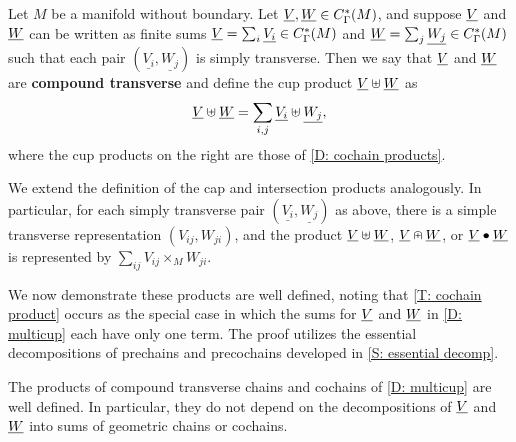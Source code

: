 \begin{definition}\label{D: multicup}
	Let $M$ be a manifold without boundary.
	Let $\underline{V}, \underline{W} \in C_\Gamma^*(M)$, and suppose $\underline{V}$ and $\underline{W}$ can be written as finite sums $\underline{V} = \sum_i \underline{V_i} \in C_\Gamma^*(M)$ and $\underline{W} = \sum_j \underline{W_j} \in C_\Gamma^*(M)$ such that each pair $(\underline{V_i},\underline{W_j})$ is simply transverse.
	Then we say that $\underline{V}$ and $\underline{W}$ are \textbf{compound transverse} and define the cup product $\underline{V}\uplus\underline{W}$ as $$\underline{V}\uplus\underline{W} = \sum_{i,j} \underline{V_i}\uplus \underline{W_j},$$
	where the cup products on the right are those of \cref{D: cochain products}.

	We extend the definition of the cap and intersection products analogously.
	In particular, for each simply transverse pair $(\underline{V_i},\underline{W_j})$ as above, there is a simple transverse representation $(V_{ij}, W_{ji})$, and the product $\underline{V}\uplus \underline{W}$, $\underline{V}\nplus \underline{W}$, or $\underline{V}\bullet\underline{W}$ is represented by $\sum_{ij}V_{ij} \times_M W_{ji}$.
\end{definition}

We now demonstrate these products are well defined, noting that \cref{T: cochain product} occurs as the special case in which the sums for $\underline{V}$ and $\underline{W}$ in \cref{D: multicup} each have only one term.
The proof utilizes the essential decompositions of prechains and precochains developed in \cref{S: essential decomp}.

\begin{theorem}\label{T: multicup}
	The products of compound transverse chains and cochains of \cref{D: multicup} are well defined.
	In particular, they do not depend on the decompositions of $\underline{V}$ and $\underline{W}$ into sums of geometric chains or cochains.
\end{theorem}


